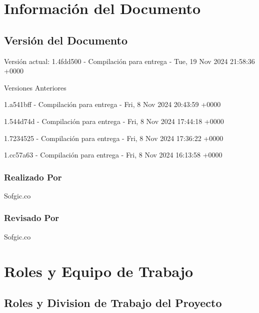 \documentclass[
  paper=a4,
  ,captions=tableheading
]{scrartcl}
\renewenvironment{quote}{\begin{customblockquote}\list{}{\rightmargin=0em\leftmargin=0em}%
\item\relax\color{blockquote-text}\ignorespaces}{\unskip\unskip\endlist\end{customblockquote}}
\begin{document}
\newpage

\section{Información del
Documento}\label{sec:informaciuxf3n-del-documento}

\subsection{Versión del Documento}\label{sec:versiuxf3n-del-documento}

\begin{quote}
\end{quote}

Versión actual: 1.4fdd500 - Compilación para entrega - Tue, 19 Nov 2024
21:58:36 +0000

Versiones Anteriores

1.a541bff - Compilación para entrega - Fri, 8 Nov 2024 20:43:59 +0000

1.544d74d - Compilación para entrega - Fri, 8 Nov 2024 17:44:18 +0000

1.7234525 - Compilación para entrega - Fri, 8 Nov 2024 17:36:22 +0000

1.cc57a63 - Compilación para entrega - Fri, 8 Nov 2024 16:13:58 +0000

\subsubsection{Realizado Por}\label{sec:realizado-por}

Sofgic.co

\subsubsection{Revisado Por}\label{sec:revisado-por}

Sofgic.co

\newpage

\section{Roles y Equipo de Trabajo}\label{sec:roles-y-equipo-de-trabajo}

\subsection{Roles y Division de Trabajo del
Proyecto}\label{sec:roles-y-division-de-trabajo-del-proyecto}
\end{document}
